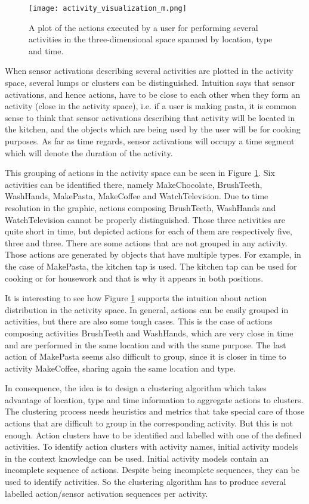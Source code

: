 \begin{figure}[htbp]
\centering
\texttt{[image: activity\_visualization\_m.png]}
    \caption{A plot of the actions executed by a user for performing several activities in the three-dimensional space spanned by location, type and time.}
    \label{fig-action-plot}
\end{figure}

When sensor activations describing several activities are plotted in the activity space, several lumps or clusters can be distinguished. Intuition says that sensor activations, and hence actions, have to be close to each other when they form an activity (close in the activity space), i.e. if a user is making pasta, it is common sense to think that sensor activations describing that activity will be located in the kitchen, and the objects which are being used by the user will be for cooking purposes. As far as time regards, sensor activations will occupy a time segment which will denote the duration of the activity.

This grouping of actions in the activity space can be seen in Figure \ref{fig-action-plot}. Six activities can be identified there, namely MakeChocolate, BrushTeeth, WashHands, MakePasta, MakeCoffee and WatchTelevision. Due to time resolution in the graphic, actions composing BrushTeeth, WashHands and WatchTelevision cannot be properly distinguished. Those three activities are quite short in time, but depicted actions for each of them are respectively five, three and three. There are some actions that are not grouped in any activity. Those actions are generated by objects that have multiple types. For example, in the case of MakePasta, the kitchen tap is used. The kitchen tap can be used for cooking or for housework and that is why it appears in both positions.

It is interesting to see how Figure \ref{fig-action-plot} supports the intuition about action distribution in the activity space. In general, actions can be easily grouped in activities, but there are also some tough cases. This is the case of actions composing activities BrushTeeth and WashHands, which are very close in time and are performed in the same location and with the same purpose. The last action of MakePasta seems also difficult to group, since it is closer in time to activity MakeCoffee, sharing again the same location and type. 

In consequence, the idea is to design a clustering algorithm which takes advantage of location, type and time information to aggregate actions to clusters. The clustering process needs heuristics and metrics that take special care of those actions that are difficult to group in the corresponding activity. But this is not enough. Action clusters have to be identified and labelled with one of the defined activities. To identify action clusters with activity names, initial activity models in the context knowledge can be used. Initial activity models contain an incomplete sequence of actions. Despite being incomplete sequences, they can be used to identify activities. So the clustering algorithm has to produce several labelled action/sensor activation sequences per activity.

